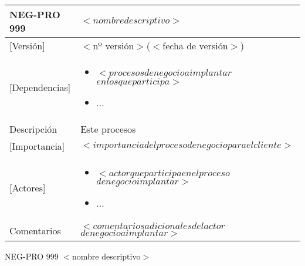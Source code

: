  \begin{Artefacto}[H]
    \centering
    \begin{tabular}{|p{3cm}|p{10cm}|}
        \hline
         \cellcolor{gray30}  NEG-PRO 999	&  $<nombre descriptivo>$\\ 
        \hline
         \cellcolor{gray30}  [Versión]	&  $<$nº versión$>$($<$fecha de versión$>$)\\   
         \hline
         \cellcolor{gray30}  [Dependencias] &  	\begin{itemize} \item $<procesos de negocio a implantar $ $en los que participa>$
\item	... \end{itemize}\\  
        \hline
        \cellcolor{gray30} Descripción	& Este procesos  \\
        \hline
         \cellcolor{gray30}[Importancia]	& $<importancia del proceso de negocio para el cliente>$  \\
        \hline
           \cellcolor{gray30}  [Actores] &  	\begin{itemize} \item $<actor que participa en el proceso $ $de negocio implantar>$
\item	... \end{itemize}\\  
         \hline
         \cellcolor{gray30}  Comentarios	&$<comentarios adicionales del actor$ $ de negocio a implantar>$\\   
        \hline
  
    \end{tabular}
\caption{NEG-PRO 999	$<$nombre descriptivo$>$ }
  \end{Artefacto}
